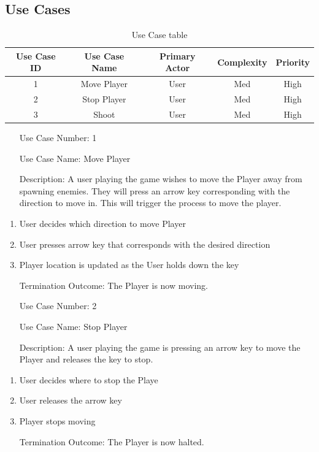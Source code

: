 \documentclass[10pt,conference,onecolumn,compsoc]{IEEEtran}
\begin{document}
\subsection{Use Cases}


\begin{table}
\centering
\begin{tabular}{|c|c|c|c|c|}
\hline
Use Case ID & Use Case Name & Primary Actor & Complexity & Priority \\
\hline 
1 & Move Player & User & Med & High\\
\hline
2 & Stop Player & User & Med & High\\
\hline 
3 & Shoot & User & Med & High\\
\hline

\end{tabular}
\caption{Use Case table}
\label{tab:useCaseIndex}
\end{table}



\begin{itemize}
\item[Use Case Number:] 1
\item[Use Case Name:] Move Player
\item[Description:] A user playing the game wishes to move the Player away from spawning enemies. They will press an arrow key corresponding with the direction to move in. This will trigger the process to move the player. 
\end{itemize}

\begin{enumerate}
\item User decides which direction to move Player
\item User presses arrow key that corresponds with the desired direction
\item Player location is updated as the User holds down the key
\item[Termination Outcome:] The Player is now moving.
\end{enumerate}


\begin{itemize}
\item[Use Case Number:] 2
\item[Use Case Name:] Stop  Player
\item[Description:] A user playing the game is pressing an arrow key to move the Player and releases the key to stop.
\end{itemize}

\begin{enumerate}
\item User decides where to stop the Playe
\item User releases the arrow key
\item Player stops moving
\item[Termination Outcome:] The Player is now halted.
\end{enumerate}
\end{document}
